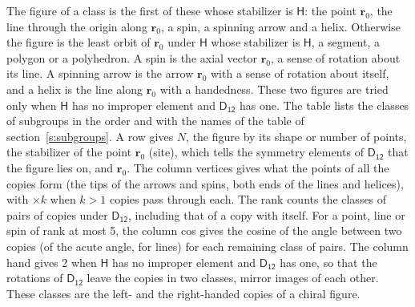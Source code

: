 \documentclass[10pt,a4paper]{article}
\numberwithin{equation}{section}
\newcommand{\grp}[1]{\mathsf{#1}}
\newcommand{\pointr}{\mathbf{r}}
\begin{document}
\leavevmode\label{n:head.figure}The figure of a class is the first of these whose stabilizer is $\grp{H}$: the point $\pointr_0$, the line through the origin along $\pointr_0$, a spin, a spinning arrow and a helix. Otherwise the figure is the least orbit of $\pointr_0$ under $\grp{H}$ whose stabilizer is $\grp{H}$, a segment, a polygon or a polyhedron. A spin is the axial vector $\pointr_0$, a sense of rotation about its line. A spinning arrow is the arrow $\pointr_0$ with a sense of rotation about itself, and a helix is the line along $\pointr_0$ with a handedness. These two figures are tried only when $\grp{H}$ has no improper element and $\grp{D_{12}}$ has one. The table lists the classes of subgroups in the order and with the names of the table of section~\ref{s:subgroups}. \label{n:head.site}A row gives $N$, the figure by its shape or number of points, the stabilizer of the point $\pointr_0$ (site), which tells the symmetry elements of $\grp{D_{12}}$ that the figure lies on, and $\pointr_0$. \label{n:head.vertices}The column vertices gives what the points of all the copies form (the tips of the arrows and spins, both ends of the lines and helices), with ${\times}k$ when $k > 1$ copies pass through each. \label{n:head.rank}The rank counts the classes of pairs of copies under $\grp{D_{12}}$, including that of a copy with itself. \label{n:head.cos}For a point, line or spin of rank at most 5, the column cos gives the cosine of the angle between two copies (of the acute angle, for lines) for each remaining class of pairs. \label{n:head.hand}The column hand gives 2 when $\grp{H}$ has no improper element and $\grp{D_{12}}$ has one, so that the rotations of $\grp{D_{12}}$ leave the copies in two classes, mirror images of each other. These classes are the left- and the right-handed copies of a chiral figure.
\end{document}
